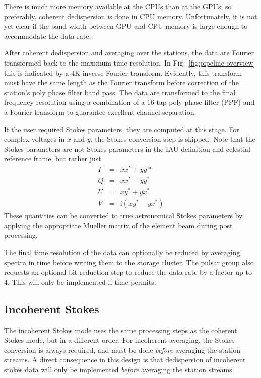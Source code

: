 \documentclass[a4paper,twoside]{article}
\begin{document}
There is much more memory available at the CPUs than at the GPUs, so
preferably, coherent dedispersion is done in CPU
memory. Unfortunately, it is not yet clear if the band width between
GPU and CPU memory is large enough to accommodate the data rate.

After coherent dedispersion and averaging over the stations, the data
are Fourier transformed back to the maximum time resolution. In
Fig.~\ref{fig:pipeline-overview} this is indicated by a $4\mathrm{K}$
inverse Fourier transform. Evidently, this transform must have the
same length as the Fourier transform before correction of the
station's poly phase filter band pass. The data are transformed to the
final frequency resolution using a combination of a 16-tap poly phase
filter (PPF) and a Fourier transform to guarantee excellent channel
separation.

If the user required Stokes parameters, they are computed at this
stage. For complex voltages in $x$ and $y$, the Stokes conversion step
is skipped. Note that the Stokes parameters are not Stokes parameters
in the IAU definition and celestial reference frame, but rather just
\begin{eqnarray}
I &=& x x^* + y y* \\
Q &=& x x^* - y y^* \\
U &=& x y^* + y x^* \\
V &=& \mathrm{i}\left(x y^* - y x^* \right)
\end{eqnarray}
These quantities can be converted to true astronomical Stokes
parameters by applying the appropriate Mueller matrix of the element
beam during post processing.

The final time resolution of the data can optionally be reduced by
averaging spectra in time before writing them to the storage
cluster. The pulsar group also requests an optional bit reduction step
to reduce the data rate by a factor up to 4. This will only be
implemented if time permits.


\subsection{Incoherent Stokes}

The incoherent Stokes mode uses the same processing steps as the
coherent Stokes mode, but in a different order. For incoherent
averaging, the Stokes conversion is always required, and must be done
\emph{before} averaging the station streams. A direct consequence in
this design is that dedispersion of incoherent stokes data will
only be implemented \emph{before} averaging the station streams.
\end{document}
